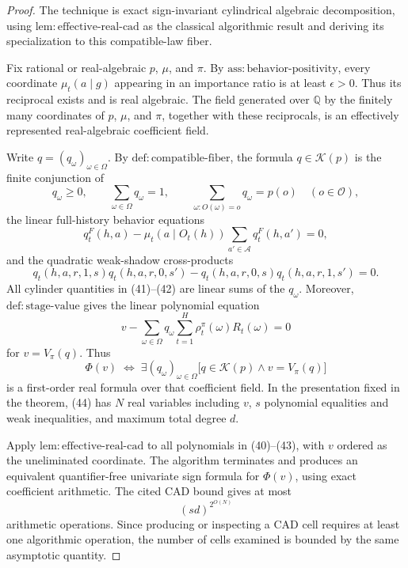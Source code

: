 \documentclass{article}
\begin{document}
\begin{proof}
The technique is exact sign-invariant cylindrical algebraic decomposition, using \(\mathrm{lem{:}effective\text{-}real\text{-}cad}\) as the classical algorithmic result and deriving its specialization to this compatible-law fiber.

Fix rational or real-algebraic \(p\), \(\mu\), and \(\pi\).  By \(\mathrm{ass{:}behavior\text{-}positivity}\), every coordinate \(\mu_t(a\mid g)\) appearing in an importance ratio is at least \(\epsilon>0\).  Thus its reciprocal exists and is real algebraic.  The field generated over \(\mathbb Q\) by the finitely many coordinates of \(p\), \(\mu\), and \(\pi\), together with these reciprocals, is an effectively represented real-algebraic coefficient field.

Write \(q=(q_\omega)_{\omega\in\Omega}\).  By \(\mathrm{def{:}compatible\text{-}fiber}\), the formula \(q\in\mathcal K(p)\) is the finite conjunction of
\[
 q_\omega\geq0,
 \qquad \sum_{\omega\in\Omega}q_\omega=1,
 \qquad
 \sum_{\omega:O(\omega)=o}q_\omega=p(o)\quad(o\in\mathcal O),
\tag{40}
\]
the linear full-history behavior equations
\[
 q_t^F(h,a)-\mu_t(a\mid O_t(h))
 \sum_{a'\in\mathcal A}q_t^F(h,a')=0,
\tag{41}
\]
and the quadratic weak-shadow cross-products
\[
 q_t(h,a,r,1,s)q_t(h,a,r,0,s')
 -q_t(h,a,r,0,s)q_t(h,a,r,1,s')=0.
\tag{42}
\]
All cylinder quantities in (41)--(42) are linear sums of the \(q_\omega\).  Moreover, \(\mathrm{def{:}stage\text{-}value}\) gives the linear polynomial equation
\[
 v-\sum_{\omega\in\Omega}q_\omega
 \sum_{t=1}^H\rho_t^\pi(\omega)R_t(\omega)=0
\tag{43}
\]
for \(v=V_\pi(q)\).  Thus
\[
 \Phi(v)\;\Longleftrightarrow\;
 \exists(q_\omega)_{\omega\in\Omega}
 \bigl[q\in\mathcal K(p)\wedge v=V_\pi(q)\bigr]
\tag{44}
\]
is a first-order real formula over that coefficient field.  In the presentation fixed in the theorem, (44) has \(N\) real variables including \(v\), \(s\) polynomial equalities and weak inequalities, and maximum total degree \(d\).

Apply \(\mathrm{lem{:}effective\text{-}real\text{-}cad}\) to all polynomials in (40)--(43), with \(v\) ordered as the uneliminated coordinate.  The algorithm terminates and produces an equivalent quantifier-free univariate sign formula for \(\Phi(v)\), using exact coefficient arithmetic.  The cited CAD bound gives at most
\[
 (sd)^{2^{O(N)}}
\tag{45}
\]
arithmetic operations.  Since producing or inspecting a CAD cell requires at least one algorithmic operation, the number of cells examined is bounded by the same asymptotic quantity.


\end{proof}
\end{document}
